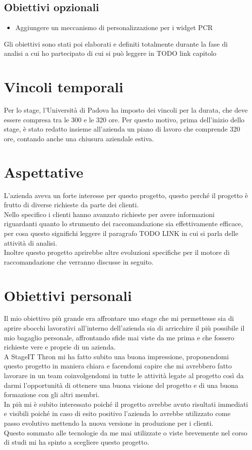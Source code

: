\documentclass[a4paper, 12pt, twoside, openright]{book}
\begin{document}
\subsection{Obiettivi opzionali}
\begin{itemize}
\item Aggiungere un meccanismo di personalizzazione per i widget PCR
\end{itemize}

Gli obiettivi sono stati poi elaborati e definiti totalmente durante la fase di analisi a cui ho partecipato di cui si può leggere in TODO link capitolo

\section{Vincoli temporali}
Per lo stage, l'Università di Padova ha imposto dei vincoli per la durata, che deve essere compresa tra le 300 e le 320 ore. Per questo motivo, prima dell'inizio dello stage, è stato redatto insieme all'azienda un piano di lavoro che comprende 320 ore, contando anche una chiusura aziendale estiva.

\section{Aspettative}
L'azienda aveva un forte interesse per questo progetto, questo perché il progetto è frutto di diverse richieste da parte dei clienti.\\
Nello specifico i clienti hanno avanzato richieste per avere informazioni riguardanti quanto lo strumento dei raccomandazione sia effettivamente efficace, per cosa questo significhi leggere il paragrafo TODO LINK in cui si parla delle attività di analisi.\\
Inoltre questo progetto aprirebbe altre evoluzioni specifiche per il motore di raccomandazione che verranno discusse in seguito.

\section{Obiettivi personali}
Il mio obiettivo più grande era affrontare uno stage che mi permettesse sia di aprire sbocchi lavorativi all'interno dell'azienda sia di arricchire il più possibile il mio bagaglio personale, affrontando sfide mai viste da me prima e che fossero richieste vere e proprie di un azienda.\\
A StageIT Thron mi ha fatto subito una buona impressione, proponendomi questo progetto in maniera chiara e facendomi capire che mi avrebbero fatto lavorare in un team coinvolgendomi in tutte le attività legate al progetto così da darmi l'opportunità di ottenere una buona visione del progetto e di una buona formazione con gli altri membri.\\
In più mi è subito interessato poiché il progetto avrebbe avuto risultati immediati e visibili poiché in caso di esito positivo l'azienda lo avrebbe utilizzato come passo evolutivo mettendo la nuova versione in produzione per i clienti.\\
Questo sommato alle tecnologie da me mai utilizzate o viste brevemente nel corso di studi mi ha spinto a scegliere questo progetto.
\end{document}

